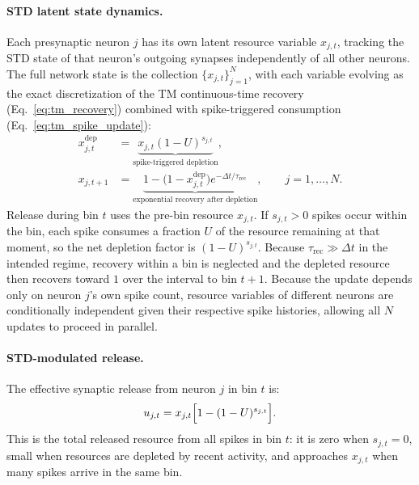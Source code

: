 \documentclass[11pt]{article}
\begin{document}
\paragraph{STD latent state dynamics.}
Each presynaptic neuron $j$ has its own latent resource variable $x_{j,t}$,
tracking the STD state of that neuron's outgoing synapses independently of all
other neurons. The full network state is the collection $\{x_{j,t}\}_{j=1}^{N}$,
with each variable evolving as the exact discretization of the TM continuous-time
recovery (Eq.~\ref{eq:tm_recovery}) combined with spike-triggered consumption
(Eq.~\ref{eq:tm_spike_update}):
\begin{equation}
\begin{aligned}
x^{\mathrm{dep}}_{j,t}
&=
\underbrace{x_{j,t}(1-U)^{s_{j,t}}}_{\text{spike-triggered depletion}},
\\
x_{j,t+1}
&=
\underbrace{1-\big(1-x^{\mathrm{dep}}_{j,t}\big)
e^{-\Delta t/\tau_{\mathrm{rec}}}}_{\text{exponential recovery after depletion}},
\qquad j=1,\dots,N .
\end{aligned}
\label{eq:std_ssm_state}
\end{equation}
Release during bin $t$ uses the pre-bin resource $x_{j,t}$. If $s_{j,t}>0$ spikes occur
within the bin, each spike consumes a fraction $U$ of the resource remaining at that
moment, so the net depletion factor is $(1-U)^{s_{j,t}}$. Because
$\tau_{\mathrm{rec}}\gg \Delta t$ in the intended regime, recovery within a bin is
neglected and the depleted resource then recovers toward $1$ over the interval to
bin $t+1$. Because the update depends only on neuron $j$'s own spike count, resource
variables of different neurons are
conditionally independent given their respective spike histories, allowing all
$N$ updates to proceed in parallel.

\paragraph{STD-modulated release.}
The effective synaptic release from neuron $j$ in bin $t$ is:
\begin{equation}
u_{j,t}=x_{j,t}\Bigl[1-(1-U)^{s_{j,t}}\Bigr].
\label{eq:std_release}
\end{equation}
This is the total released resource from all spikes in bin $t$: it is zero when
$s_{j,t}=0$, small when resources are depleted by recent activity, and approaches
$x_{j,t}$ when many spikes arrive in the same bin.
\end{document}
